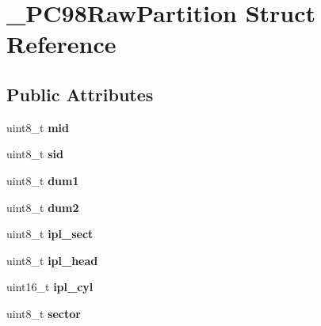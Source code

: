\hypertarget{struct__PC98RawPartition}{\section{\-\_\-\-P\-C98\-Raw\-Partition Struct Reference}
\label{struct__PC98RawPartition}
}
\subsection*{Public Attributes}
\begin{DoxyCompactItemize}
\item 
\hypertarget{struct__PC98RawPartition_a11364eb647ed5b49da2fbde838899af6}{uint8\-\_\-t {\bfseries mid}}\label{struct__PC98RawPartition_a11364eb647ed5b49da2fbde838899af6}

\item 
\hypertarget{struct__PC98RawPartition_a6ef573976fcf9c37da1cb83a7bff3504}{uint8\-\_\-t {\bfseries sid}}\label{struct__PC98RawPartition_a6ef573976fcf9c37da1cb83a7bff3504}

\item 
\hypertarget{struct__PC98RawPartition_aa9a08aebb717ea8e3a3bda8c446414f3}{uint8\-\_\-t {\bfseries dum1}}\label{struct__PC98RawPartition_aa9a08aebb717ea8e3a3bda8c446414f3}

\item 
\hypertarget{struct__PC98RawPartition_a206633cc145e41c668ff94fba41f25e7}{uint8\-\_\-t {\bfseries dum2}}\label{struct__PC98RawPartition_a206633cc145e41c668ff94fba41f25e7}

\item 
\hypertarget{struct__PC98RawPartition_ad0a47db588d137186139edb44a0ee31a}{uint8\-\_\-t {\bfseries ipl\-\_\-sect}}\label{struct__PC98RawPartition_ad0a47db588d137186139edb44a0ee31a}

\item 
\hypertarget{struct__PC98RawPartition_a0cadc4b2a81b4998b4b55a2da3a5521e}{uint8\-\_\-t {\bfseries ipl\-\_\-head}}\label{struct__PC98RawPartition_a0cadc4b2a81b4998b4b55a2da3a5521e}

\item 
\hypertarget{struct__PC98RawPartition_add9f2479cfb1ba1691819b353e00dc8f}{uint16\-\_\-t {\bfseries ipl\-\_\-cyl}}\label{struct__PC98RawPartition_add9f2479cfb1ba1691819b353e00dc8f}

\item 
\hypertarget{struct__PC98RawPartition_a5a4e4ddcebc9c8d77b31f839ce54e782}{uint8\-\_\-t {\bfseries sector}}\label{struct__PC98RawPartition_a5a4e4ddcebc9c8d77b31f839ce54e782}


\end{DoxyCompactItemize}
